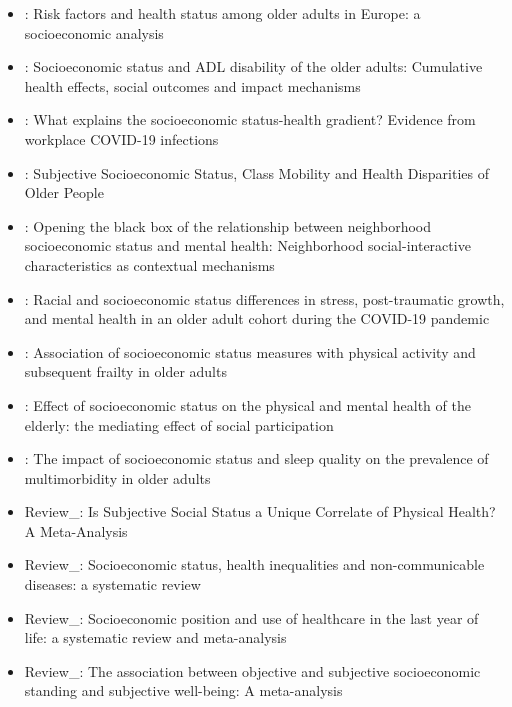 \documentclass[12pt]{article}
\begin{document}
\begin{itemize}
\begin{itemize}
        \item \cite{tur2022risk}: Risk factors and health status among older adults in Europe: a socioeconomic analysis
        \item \cite{liu2022socioeconomic}: Socioeconomic status and ADL disability of the older adults: Cumulative health effects, social outcomes and impact mechanisms
        \item \cite{godefroy2022explains}: What explains the socioeconomic status-health gradient? Evidence from workplace COVID-19 infections 
        \item \cite{ran2022subjective}: Subjective Socioeconomic Status, Class Mobility and Health Disparities of Older People
        \item \cite{jakobsen2022opening}: Opening the black box of the relationship between neighborhood socioeconomic status and mental health: Neighborhood social-interactive characteristics as contextual mechanisms 
        \item \cite{willey2022racial}: Racial and socioeconomic status differences in stress, post-traumatic growth, and mental health in an older adult cohort during the COVID-19 pandemic
        \item \cite{kheifets2022association}: Association of socioeconomic status measures with physical activity and subsequent frailty in older adults
        \item \cite{zhang2022effect}: Effect of socioeconomic status on the physical and mental health of the elderly: the mediating effect of social participation
        \item \cite{xue2022impact}: The impact of socioeconomic status and sleep quality on the prevalence of multimorbidity in older adults
        \item Review\_\cite{cundiff2017subjective}: Is Subjective Social Status a Unique Correlate of Physical Health? A Meta-Analysis
        \item Review\_\cite{lago2018socioeconomic}: Socioeconomic status, health inequalities and non-communicable diseases: a systematic review
        \item Review\_\cite{davies2019socioeconomic}: Socioeconomic position and use of healthcare in the last year of life: a systematic review and meta-analysis
        \item Review\_\cite{tan2020association}: The association between objective and subjective socioeconomic standing and subjective well-being: A meta-analysis
    \end{itemize}

\end{itemize}
\end{document}

